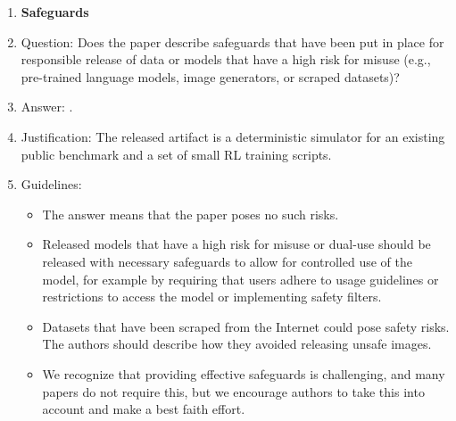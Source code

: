 \begin{enumerate}
\item {\bf Safeguards}
    \item[] Question: Does the paper describe safeguards that have been put in place for responsible release of data or models that have a high risk for misuse (e.g., pre-trained language models, image generators, or scraped datasets)?
    \item[] Answer: \answerNA{}.
    \item[] Justification: The released artifact is a deterministic simulator for an existing public benchmark and a set of small RL training scripts.
    \item[] Guidelines:
    \begin{itemize}
        \item The answer \answerNA{} means that the paper poses no such risks.
        \item Released models that have a high risk for misuse or dual-use should be released with necessary safeguards to allow for controlled use of the model, for example by requiring that users adhere to usage guidelines or restrictions to access the model or implementing safety filters. 
        \item Datasets that have been scraped from the Internet could pose safety risks. The authors should describe how they avoided releasing unsafe images.
        \item We recognize that providing effective safeguards is challenging, and many papers do not require this, but we encourage authors to take this into account and make a best faith effort.
    \end{itemize}


\end{enumerate}
